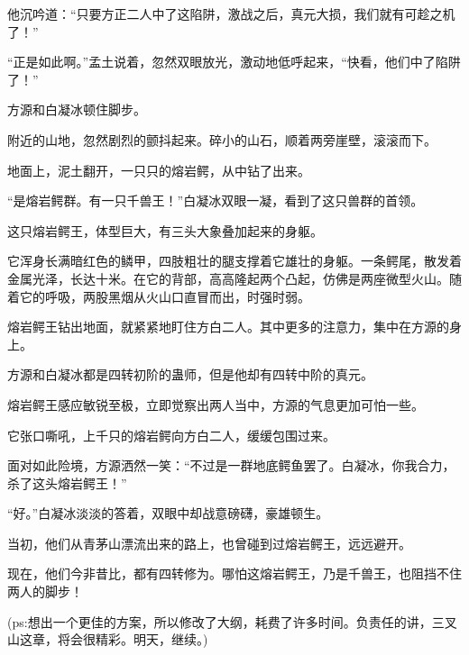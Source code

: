 \begin{this_body}
他沉吟道：“只要方正二人中了这陷阱，激战之后，真元大损，我们就有可趁之机了！”

“正是如此啊。”孟土说着，忽然双眼放光，激动地低呼起来，“快看，他们中了陷阱了！”

方源和白凝冰顿住脚步。

附近的山地，忽然剧烈的颤抖起来。碎小的山石，顺着两旁崖壁，滚滚而下。

地面上，泥土翻开，一只只的熔岩鳄，从中钻了出来。

“是熔岩鳄群。有一只千兽王！”白凝冰双眼一凝，看到了这只兽群的首领。

这只熔岩鳄王，体型巨大，有三头大象叠加起来的身躯。

它浑身长满暗红色的鳞甲，四肢粗壮的腿支撑着它雄壮的身躯。一条鳄尾，散发着金属光泽，长达十米。在它的背部，高高隆起两个凸起，仿佛是两座微型火山。随着它的呼吸，两股黑烟从火山口直冒而出，时强时弱。

熔岩鳄王钻出地面，就紧紧地盯住方白二人。其中更多的注意力，集中在方源的身上。

方源和白凝冰都是四转初阶的蛊师，但是他却有四转中阶的真元。

熔岩鳄王感应敏锐至极，立即觉察出两人当中，方源的气息更加可怕一些。

它张口嘶吼，上千只的熔岩鳄向方白二人，缓缓包围过来。

面对如此险境，方源洒然一笑：“不过是一群地底鳄鱼罢了。白凝冰，你我合力，杀了这头熔岩鳄王！”

“好。”白凝冰淡淡的答着，双眼中却战意磅礴，豪雄顿生。

当初，他们从青茅山漂流出来的路上，也曾碰到过熔岩鳄王，远远避开。

现在，他们今非昔比，都有四转修为。哪怕这熔岩鳄王，乃是千兽王，也阻挡不住两人的脚步！

(ps:想出一个更佳的方案，所以修改了大纲，耗费了许多时间。负责任的讲，三叉山这章，将会很精彩。明天，继续。)

\end{this_body}

